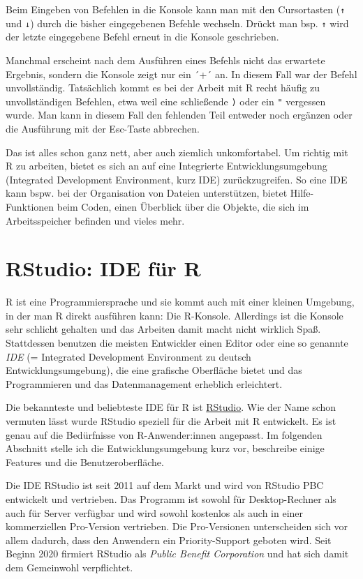 \documentclass[
]{book}
\begin{document}
Beim Eingeben von Befehlen in die Konsole kann man mit den Cursortasten (\texttt{↑} und \texttt{↓}) durch die bisher eingegebenen Befehle wechseln. Drückt man bsp. \texttt{↑} wird der letzte eingegebene Befehl erneut in die Konsole geschrieben.

Manchmal erscheint nach dem Ausführen eines Befehls nicht das erwartete Ergebnis, sondern die Konsole zeigt nur ein ´+´ an. In diesem Fall war der Befehl unvollständig. Tatsächlich kommt es bei der Arbeit mit R recht häufig zu unvollständigen Befehlen, etwa weil eine schließende \texttt{)} oder ein \texttt{"} vergessen wurde. Man kann in diesem Fall den fehlenden Teil entweder noch ergänzen oder die Ausführung mit der Esc-Taste abbrechen.

Das ist alles schon ganz nett, aber auch ziemlich unkomfortabel. Um richtig mit R zu arbeiten, bietet es sich an auf eine Integrierte Entwicklungsumgebung (Integrated Development Environment, kurz IDE) zurückzugreifen.
So eine IDE kann bspw. bei der Organisation von Dateien unterstützen, bietet Hilfe-Funktionen beim Coden, einen Überblick über die Objekte, die sich im Arbeitsspeicher befinden und vieles mehr.

\hypertarget{rstudio-ide-fuxfcr-r}{%
\section{RStudio: IDE für R}\label{rstudio-ide-fuxfcr-r}}

R ist eine Programmiersprache und sie kommt auch mit einer kleinen Umgebung, in der man R direkt ausführen kann: Die R-Konsole. Allerdings ist die Konsole sehr schlicht gehalten und das Arbeiten damit macht nicht wirklich Spaß. Stattdessen benutzen die meisten Entwickler einen Editor oder eine so genannte \emph{IDE} (= Integrated Development Environment zu deutsch Entwicklungsumgebung), die eine grafische Oberfläche bietet und das Programmieren und das Datenmanagement erheblich erleichtert.

Die bekannteste und beliebteste IDE für R ist \href{https://rstudio.com/}{RStudio}.
Wie der Name schon vermuten lässt wurde RStudio speziell für die Arbeit mit R entwickelt. Es ist genau auf die Bedürfnisse von R-Anwender:innen angepasst. Im folgenden Abschnitt stelle ich die Entwicklungsumgebung kurz vor, beschreibe einige Features und die Benutzeroberfläche.

Die IDE RStudio ist seit 2011 auf dem Markt und wird von RStudio PBC entwickelt und vertrieben.
Das Programm ist sowohl für Desktop-Rechner als auch für Server verfügbar und wird sowohl kostenlos als auch in einer kommerziellen Pro-Version vertrieben.
Die Pro-Versionen unterscheiden sich vor allem dadurch, dass den Anwendern ein Priority-Support geboten wird.
Seit Beginn 2020 firmiert RStudio als \emph{Public Benefit Corporation} und hat sich damit dem Gemeinwohl verpflichtet.
\end{document}
